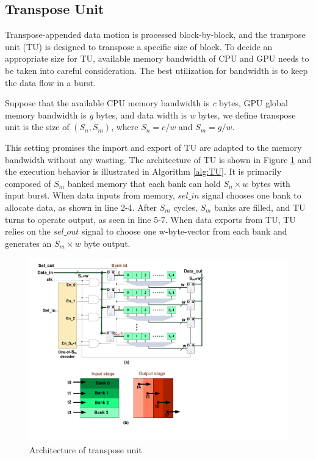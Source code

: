 \documentclass[10pt,journal,compsoc]{IEEEtran}
\begin{document}
\subsection{Transpose Unit}
\label{cha:TU}


Transpose-appended data motion is processed block-by-block, and the transpose unit (TU) is designed to transpose a specific size of block.
To decide an appropriate size for TU, available memory bandwidth of CPU and GPU needs to be taken into careful consideration.
The best utilization for bandwidth is to keep the data flow in a burst.

Suppose that the available CPU memory bandwidth is \textit{c} bytes, GPU global memory bandwidth is \textit{g} bytes, and data width is \textit{w} bytes, we define transpose unit is the size of $ (S_{n}, S_{m}) $, where $ S_{n}=c/w $ and $ S_{m}=g/w $.


This setting promises the import and export of TU are adapted to the memory bandwidth without any wasting.
The architecture of TU is shown in Figure \ref{fig:TU} and the execution behavior is illustrated in Algorithm \ref{alg:TU}. It is primarily composed of $ S_{m}$ banked memory that each bank can hold $ S_{n} \times w $ bytes with  input burst. When data inputs from memory, $  sel\_in $ signal chooses one bank to allocate data, as shown in line 2-4. After $ S_{m}$ cycles, $ S_{m}$ banks are filled, and TU turns to operate output, as seen in line 5-7. When data exports from TU, TU relies on the $ sel\_out $ signal to choose one w-byte-vector from each bank and generates an $  S_{m}\times w $ byte output.

\begin{figure}[tb]
\begin{center}
\graphicspath{{picture/}}
\includegraphics[scale=0.4]{TU_v02}
\caption{Architecture of transpose unit}
\label{fig:TU}
\end{center}
\end{figure}
\end{document}
